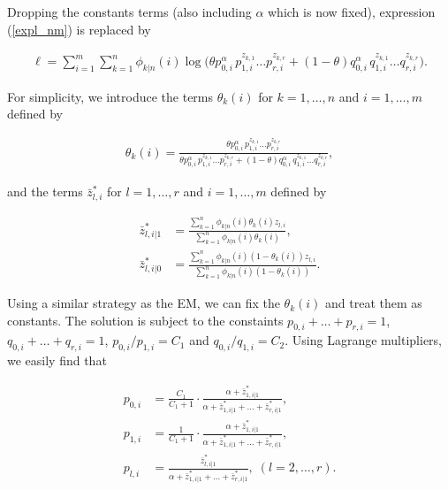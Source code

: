 \documentclass[12pt]{article}
\begin{document}
\begin{appendices}
    Dropping the constants terms (also including $\alpha$ which is
    now fixed), expression (\ref{expl_nm}) is replaced by

    \begin{align*}
    \ell = \sum_{i=1}^m\sum_{k=1}^n \phi_{k|n}(i)
      \log\Big(\theta p_{0,i}^{\alpha} \, p_{1,i}^{z_{k,1}} \ldots 
      p_{r,i}^{z_{k,r}} +
      (1-\theta) q_{0,i}^{\alpha} \, q_{1,i}^{z_{k,1}} \ldots
      q_{r,i}^{z_{k,r}} \Big).
    \end{align*}

    For simplicity, we introduce the terms $\theta_k(i)$ for
    $k = 1, \ldots, n$ and $i = 1, \ldots, m$ defined by
  
    \begin{align}
    \theta_k(i) = \frac{\theta p_{0,i}^{\alpha} \, p_{1,i}^{z_{k,1}}
    \ldots p_{r,i}^{z_{k,r}}}
    {\theta p_{0,i}^{\alpha} \, p_{1,i}^{z_{k,1}}
    \ldots p_{r,i}^{z_{k,r}} + (1-\theta) q_{0,i}^{\alpha} \,
    q_{1,i}^{z_{k,1}} \ldots q_{r,i}^{z_{k,r}}},
\label{thetaki}
    \end{align}

\noindent
    and the terms $\bar{z}_{l,i}^*$ for $l = 1, \ldots, r$ and
    $i = 1, \ldots, m$ defined by

    \begin{align*}
    \bar{z}_{l,i|1}^* &= \frac{\sum_{k=1}^n\phi_{k|n}(i)
      \theta_k(i)z_{l,i}}{\sum_{k=1}^n\phi_{k|n}(i)\theta_k(i)}, \\
    \bar{z}_{l,i|0}^* &= \frac{\sum_{k=1}^n\phi_{k|n}(i)
      (1-\theta_k(i))z_{l,i}}{\sum_{k=1}^n\phi_{k|n}(i)(1-\theta_k(i))}.
    \end{align*}

    Using a similar strategy as the EM, we can fix the $\theta_k(i)$
    and treat them as constants. The solution is subject to the
    constaints $p_{0,i}+\ldots+p_{r,i} = 1$,
    $q_{0,i}+\ldots+q_{r,i} = 1$, $p_{0,i}/p_{1,i} = C_1$ and
    $q_{0,i}/q_{1,i} = C_2$. Using Lagrange multipliers, we easily
    find that

    \begin{align*}
    p_{0,i} &= \frac{C_1}{C_1+1} \cdot \frac{\alpha+\bar{z}_{1,i|1}^*}
      {\alpha + \bar{z}_{1,i|1}^* +
      \ldots + \bar{z}_{r,i|1}^*}, \\
    p_{1,i} &= \frac{1}{C_1+1} \cdot \frac{\alpha+\bar{z}_{1,i|1}^*}
      {\alpha + \bar{z}_{1,i|1}^* +
      \ldots + \bar{z}_{r,i|1}^*}, \\
    p_{l,i} &= \frac{\bar{z}_{l,i|1}^*}{\alpha + \bar{z}_{1,i|1}^* +
      \ldots + \bar{z}_{r,i|1}^*}, \; (l = 2, \ldots, r).
    \end{align*}


\end{appendices}
\end{document}

